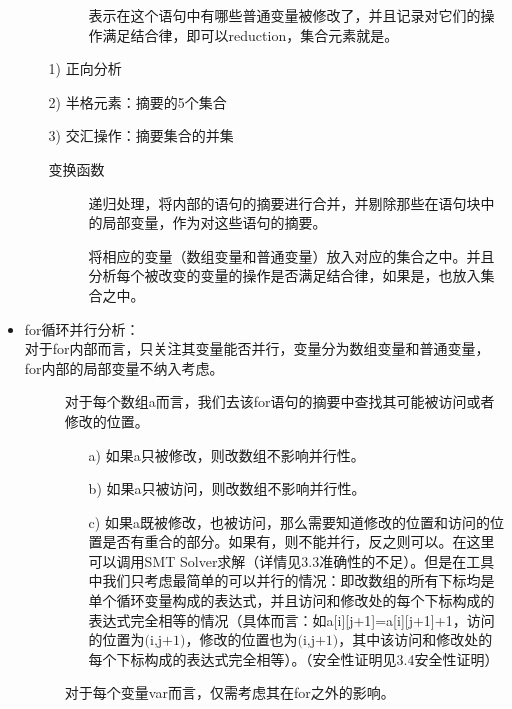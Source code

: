 \documentclass[12pt]{article}
\begin{document}
\begin{itemize}
\begin{itemize}
\begin{description}
							\item[]
								表示在这个语句中有哪些普通变量被修改了，并且记录对它们的操作满足结合律，即可以reduction，集合元素就是。
						\end{description}
					\item[1)] 正向分析
					\item[2)] 半格元素：摘要的5个集合
					\item[3)] 交汇操作：摘要集合的并集
					\begin{item}[4)] 
						变换函数\\
						\begin{description}
							\item[] 递归处理，将内部的语句的摘要进行合并，并剔除那些在语句块中的局部变量，作为对这些语句的摘要。
							\item[]	 将相应的变量（数组变量和普通变量）放入对应的集合之中。并且分析每个被改变的变量的操作是否满足结合律，如果是，也放入集合之中。
						\end{description}
					\end{item}
				\end{itemize}
				\item for循环并行分析：\\
					对于for内部而言，只关注其变量能否并行，变量分为数组变量和普通变量，for内部的局部变量不纳入考虑。
					\begin{description}
						\item[] 对于每个数组a而言，我们去该for语句的摘要中查找其可能被访问或者修改的位置。\\
							\begin{itemize}
								\item[a)] 如果a只被修改，则改数组不影响并行性。
								\item[b)] 如果a只被访问，则改数组不影响并行性。
								\item[c)] 如果a既被修改，也被访问，那么需要知道修改的位置和访问的位置是否有重合的部分。如果有，则不能并行，反之则可以。在这里可以调用SMT Solver求解（详情见3.3准确性的不足）。但是在工具中我们只考虑最简单的可以并行的情况：即改数组的所有下标均是单个循环变量构成的表达式，并且访问和修改处的每个下标构成的表达式完全相等的情况（具体而言：如a[i][j+1]=a[i][j+1]+1，访问的位置为$\text{(i,j+1)}$，修改的位置也为$\text{(i,j+1)}$，其中该访问和修改处的每个下标构成的表达式完全相等）。（安全性证明见3.4安全性证明）
							\end{itemize}
						\item[]	 对于每个变量var而言，仅需考虑其在for之外的影响。\\

\end{description}
\end{itemize}
\end{document}
